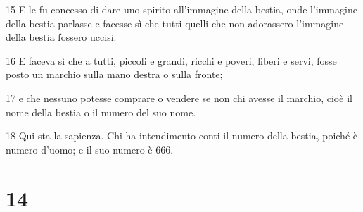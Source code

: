 \par 15 E le fu concesso di dare uno spirito all'immagine della bestia, onde l'immagine della bestia parlasse e facesse sì che tutti quelli che non adorassero l'immagine della bestia fossero uccisi.
\par 16 E faceva sì che a tutti, piccoli e grandi, ricchi e poveri, liberi e servi, fosse posto un marchio sulla mano destra o sulla fronte;
\par 17 e che nessuno potesse comprare o vendere se non chi avesse il marchio, cioè il nome della bestia o il numero del suo nome.
\par 18 Qui sta la sapienza. Chi ha intendimento conti il numero della bestia, poiché è numero d'uomo; e il suo numero è 666.

\chapter{14}

